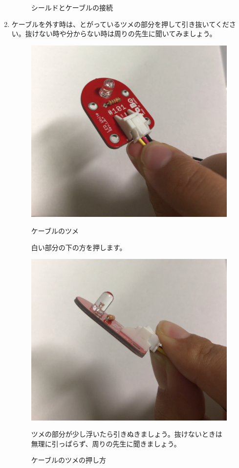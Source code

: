 \begin{enumerate}
\begin{figure}[H]
 \caption{シールドとケーブルの接続}
\end{figure}
\item ケーブルを外す時は、とがっているツメの部分を押して引き抜いてください。抜けない時や分からない時は周りの先生に聞いてみましょう。\\
\begin{figure}[H]
  \begin{minipage}[t]{0.48\columnwidth}
    \centering
 \includegraphics[width=0.8\hsize]{images/chap05/text05-img010.jpg}
    \caption{ケーブルのツメ}
白い部分の下の方を押します。
  \end{minipage}
  \hspace{0.04\columnwidth} %
  \begin{minipage}[t]{0.48\columnwidth}
    \centering
    \includegraphics[width=0.8\hsize]{images/chap05/text05-img011.jpg}
    \caption{ケーブルのツメの押し方}
ツメの部分が少し浮いたら引きぬきましょう。抜けないときは無理に引っぱらず、周りの先生に聞きましょう。
  \end{minipage}
\end{figure}
\end{enumerate}
\begin{tcolorbox}[title=\useOmetoi]
\begin{enumerate}
\end{enumerate}
\end{tcolorbox}















